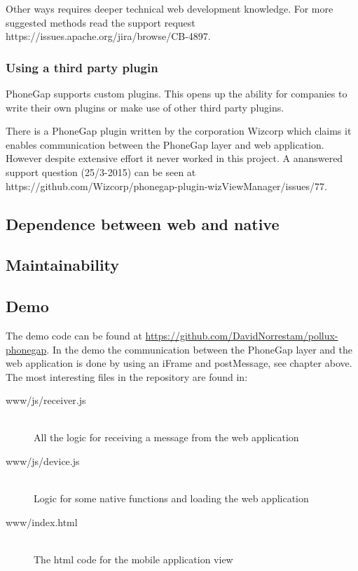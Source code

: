 Other ways requires deeper technical web development knowledge. For more suggested methods read the support request https://issues.apache.org/jira/browse/CB-4897.

\subsubsection{Using a third party plugin}
PhoneGap supports custom plugins. This opens up the ability for companies to write their own plugins or make use of other third party plugins.

There is a PhoneGap plugin written by the corporation Wizcorp which claims it enables communication between the PhoneGap layer and web application. However despite extensive effort it never worked in this project. A ananswered support question (25/3-2015) can be seen at https://github.com/Wizcorp/phonegap-plugin-wizViewManager/issues/77. 

\subsection{Dependence between web and native}

\subsection{Maintainability}

\subsection{Demo}
The demo code can be found at \url{https://github.com/DavidNorrestam/pollux-phonegap}. In the demo the communication between the PhoneGap layer and the web application is done by using an iFrame and postMessage, see chapter above. The most interesting files in the repository are found in:

\begin{description}
  \item[www/js/receiver.js] \hfill \\
    All the logic for receiving a message from the web application
  \item[www/js/device.js] \hfill \\
    Logic for some native functions and loading the web application
  \item[www/index.html] \hfill \\
    The html code for the mobile application view
\end{description}